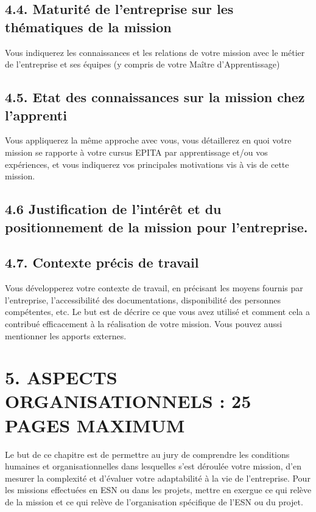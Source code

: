 \documentclass[a4paper, 12pt]{article}
\begin{document}
\subsection{4.4. Maturité de l’entreprise sur les thématiques de la mission}

Vous indiquerez les connaissances et les relations de votre mission avec le métier de l’entreprise et ses
équipes (y compris de votre Maître d’Apprentissage)

\subsection{4.5. Etat des connaissances sur la mission chez l’apprenti}

Vous appliquerez la même approche avec vous, vous détaillerez en quoi votre mission se rapporte à
votre cursus EPITA par apprentissage et/ou vos expériences, et vous indiquerez vos principales
motivations vis à vis de cette mission.

\subsection{4.6 Justification de l’intérêt et du positionnement de la mission pour l’entreprise.}

\subsection{4.7. Contexte précis de travail}

Vous développerez votre contexte de travail, en précisant les moyens fournis par l’entreprise,
l’accessibilité des documentations, disponibilité des personnes compétentes, etc. Le but est de décrire
ce que vous avez utilisé et comment cela a contribué efficacement à la réalisation de votre mission.
Vous pouvez aussi mentionner les apports externes.

\newpage{}
\section{5. ASPECTS ORGANISATIONNELS : 25 PAGES MAXIMUM}

Le but de ce chapitre est de permettre au jury de comprendre les conditions humaines et
organisationnelles dans lesquelles s’est déroulée votre mission, d’en mesurer la complexité et
d’évaluer votre adaptabilité à la vie de l’entreprise.
Pour les missions effectuées en ESN ou dans les projets, mettre en exergue ce qui relève de la mission
et ce qui relève de l’organisation spécifique de l’ESN ou du projet.
\end{document}
